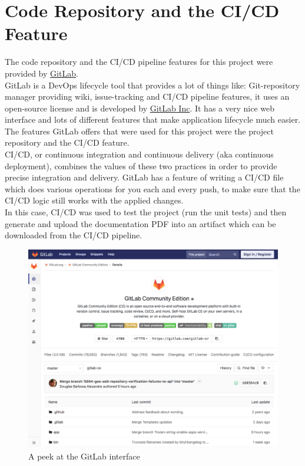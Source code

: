 \section{Code Repository and the CI/CD Feature}
\label{sec:GitLab}
The code repository and the CI/CD pipeline features for this project were provided by \href{https://gitlab.com/}{GitLab}.\\
GitLab is a DevOps lifecycle tool that provides a lot of things like: Git-repository manager providing wiki, issue-tracking and CI/CD pipeline features, it uses an open-source license and is developed by \href{https://about.gitlab.com/company/}{GitLab Inc}.
It has a very nice web interface and lots of different features that make application lifecycle much easier. The features GitLab offers that were used for this project were the project repository and the CI/CD feature.\\
\newline
CI/CD, or continuous integration and continuous delivery (aka continuous deployment), combines the values of these two practices in order to provide precise integration and delivery.
GitLab has a feature of writing a CI/CD file which does various operations for you each and every push, to make sure that the CI/CD logic still works with the applied changes.\\
In this case, CI/CD was used to test the project (run the unit tests) and then generate and upload the documentation PDF into an artifact which can be downloaded from the CI/CD pipeline.
\begin{figure}[H]
	\includegraphics[width=\linewidth]{./Images/Implementation/gitlab_view.png}
	\caption{A peek at the GitLab interface}
\end{figure}	
